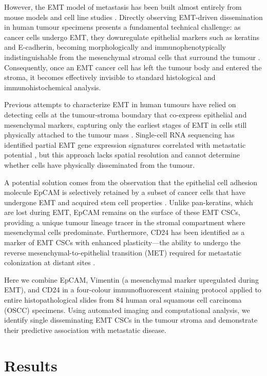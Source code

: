 \documentclass[11pt]{article}
\begin{document}
However, the EMT model of metastasis has been built almost entirely from mouse models and cell line studies \citep{Rhim2012,Fischer2015,Zheng2015}. Directly observing EMT-driven dissemination in human tumour specimens presents a fundamental technical challenge: as cancer cells undergo EMT, they downregulate epithelial markers such as keratins and E-cadherin, becoming morphologically and immunophenotypically indistinguishable from the mesenchymal stromal cells that surround the tumour \citep{Kalluri2009,Ye2015}. Consequently, once an EMT cancer cell has left the tumour body and entered the stroma, it becomes effectively invisible to standard histological and immunohistochemical analysis.

Previous attempts to characterize EMT in human tumours have relied on detecting cells at the tumour-stroma boundary that co-express epithelial and mesenchymal markers, capturing only the earliest stages of EMT in cells still physically attached to the tumour mass \citep{Brabletz2001,Savagner2010}. Single-cell RNA sequencing has identified partial EMT gene expression signatures correlated with metastatic potential \citep{Puram2017,Pastushenko2018}, but this approach lacks spatial resolution and cannot determine whether cells have physically disseminated from the tumour.

A potential solution comes from the observation that the epithelial cell adhesion molecule EpCAM is selectively retained by a subset of cancer cells that have undergone EMT and acquired stem cell properties \citep{Grosse-Wilde2015,Bierie2017}. Unlike pan-keratins, which are lost during EMT, EpCAM remains on the surface of these EMT CSCs, providing a unique tumour lineage tracer in the stromal compartment where mesenchymal cells predominate. Furthermore, CD24 has been identified as a marker of EMT CSCs with enhanced plasticity---the ability to undergo the reverse mesenchymal-to-epithelial transition (MET) required for metastatic colonization at distant sites \citep{Al-Hajj2003,Grosse-Wilde2015}.

Here we combine EpCAM, Vimentin (a mesenchymal marker upregulated during EMT), and CD24 in a four-colour immunofluorescent staining protocol applied to entire histopathological slides from 84 human oral squamous cell carcinoma (OSCC) specimens. Using automated imaging and computational analysis, we identify single disseminating EMT CSCs in the tumour stroma and demonstrate their predictive association with metastatic disease.

\section{Results}
\end{document}
